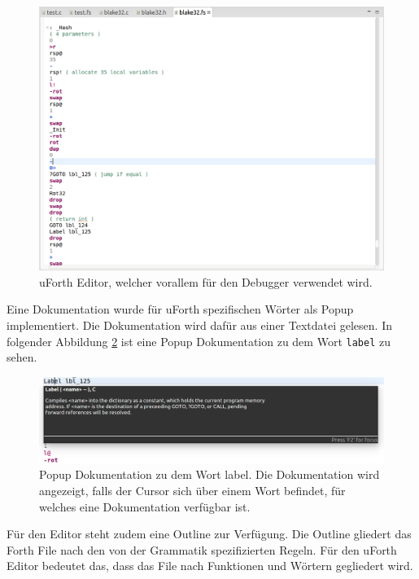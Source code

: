 \begin{figure}[H]
	\centering
		\includegraphics[scale=0.4]{fortheditor/fortheditor.png}
		\caption{uForth Editor, welcher vorallem für den Debugger verwendet wird.}
		\label{fig:fortheditor}
\end{figure}

\newpage

Eine Dokumentation wurde für uForth spezifischen Wörter als Popup implementiert. Die Dokumentation wird dafür aus einer Textdatei gelesen. In folgender Abbildung \ref{fig:docpopup} ist eine Popup Dokumentation zu dem Wort \verb!label! zu sehen.

\begin{figure}[H]
	\centering
		\includegraphics[scale=0.4]{fortheditor/doc.png}
		\caption{Popup Dokumentation zu dem Wort label. Die Dokumentation wird angezeigt, falls der Cursor sich über einem Wort befindet, für welches eine Dokumentation verfügbar ist.}
		\label{fig:docpopup}
\end{figure}

Für den Editor steht zudem eine Outline zur Verfügung. Die Outline gliedert das Forth File nach den von der Grammatik spezifizierten Regeln. Für den uForth Editor bedeutet das, dass das File nach Funktionen und Wörtern gegliedert wird.

